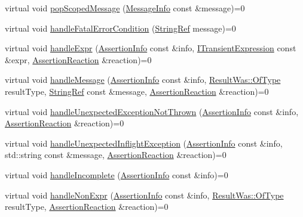 \begin{DoxyCompactItemize}
\item 
virtual void \mbox{\hyperlink{struct_catch_1_1_i_result_capture_a42bcb13276706bf8c3ce081ce16d37fd}{pop\+Scoped\+Message}} (\mbox{\hyperlink{struct_catch_1_1_message_info}{Message\+Info}} const \&message)=0
\item 
virtual void \mbox{\hyperlink{struct_catch_1_1_i_result_capture_a48559e6598ba9474b903697b69c769b2}{handle\+Fatal\+Error\+Condition}} (\mbox{\hyperlink{class_catch_1_1_string_ref}{String\+Ref}} message)=0
\item 
virtual void \mbox{\hyperlink{struct_catch_1_1_i_result_capture_a59a2b05391e464954575d2afb6d5d607}{handle\+Expr}} (\mbox{\hyperlink{struct_catch_1_1_assertion_info}{Assertion\+Info}} const \&info, \mbox{\hyperlink{struct_catch_1_1_i_transient_expression}{I\+Transient\+Expression}} const \&expr, \mbox{\hyperlink{struct_catch_1_1_assertion_reaction}{Assertion\+Reaction}} \&reaction)=0
\item 
virtual void \mbox{\hyperlink{struct_catch_1_1_i_result_capture_a21788ebc64571abf322b80c8cc51794d}{handle\+Message}} (\mbox{\hyperlink{struct_catch_1_1_assertion_info}{Assertion\+Info}} const \&info, \mbox{\hyperlink{struct_catch_1_1_result_was_a624e1ee3661fcf6094ceef1f654601ef}{Result\+Was\+::\+Of\+Type}} result\+Type, \mbox{\hyperlink{class_catch_1_1_string_ref}{String\+Ref}} const \&message, \mbox{\hyperlink{struct_catch_1_1_assertion_reaction}{Assertion\+Reaction}} \&reaction)=0
\item 
virtual void \mbox{\hyperlink{struct_catch_1_1_i_result_capture_a6382ed20486e2d9a020da971c6d5c53d}{handle\+Unexpected\+Exception\+Not\+Thrown}} (\mbox{\hyperlink{struct_catch_1_1_assertion_info}{Assertion\+Info}} const \&info, \mbox{\hyperlink{struct_catch_1_1_assertion_reaction}{Assertion\+Reaction}} \&reaction)=0
\item 
virtual void \mbox{\hyperlink{struct_catch_1_1_i_result_capture_afc97bc69829185222f955ebeef97adfe}{handle\+Unexpected\+Inflight\+Exception}} (\mbox{\hyperlink{struct_catch_1_1_assertion_info}{Assertion\+Info}} const \&info, std\+::string const \&message, \mbox{\hyperlink{struct_catch_1_1_assertion_reaction}{Assertion\+Reaction}} \&reaction)=0
\item 
virtual void \mbox{\hyperlink{struct_catch_1_1_i_result_capture_a89b89372eb09cc44f8dcad363de6157d}{handle\+Incomplete}} (\mbox{\hyperlink{struct_catch_1_1_assertion_info}{Assertion\+Info}} const \&info)=0
\item 
virtual void \mbox{\hyperlink{struct_catch_1_1_i_result_capture_ab7dbdf8aa28427119583e24dbb302c63}{handle\+Non\+Expr}} (\mbox{\hyperlink{struct_catch_1_1_assertion_info}{Assertion\+Info}} const \&info, \mbox{\hyperlink{struct_catch_1_1_result_was_a624e1ee3661fcf6094ceef1f654601ef}{Result\+Was\+::\+Of\+Type}} result\+Type, \mbox{\hyperlink{struct_catch_1_1_assertion_reaction}{Assertion\+Reaction}} \&reaction)=0

\end{DoxyCompactItemize}
